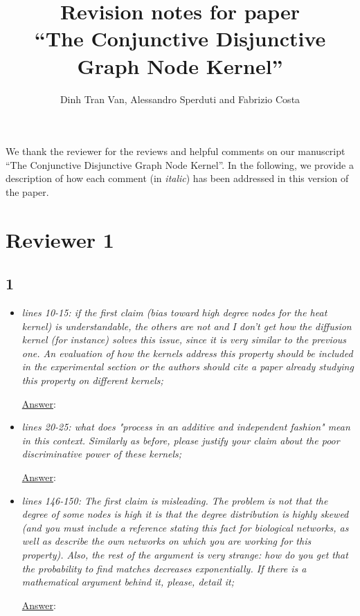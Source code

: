 \documentclass[11pt]{article}
\title{Revision notes for paper\\``The Conjunctive Disjunctive Graph Node Kernel''}
\author{Dinh Tran Van, Alessandro Sperduti and Fabrizio Costa }
\begin{document}
\maketitle

We thank the reviewer for the reviews and helpful comments on our manuscript ``The Conjunctive Disjunctive Graph Node Kernel''. 
In the following, we provide a description of how each comment (in \emph{italic}) has been addressed in this version of the paper.

\section{Reviewer 1}
\subsection*{1}
\begin{itemize}
\item \textit{lines 10-15: if the first claim (bias toward high degree nodes for the heat kernel) is understandable, the others are not and I don't get how the diffusion kernel (for instance) solves this issue, since it is very similar to the previous one. An evaluation of how the kernels address this property should be included in the experimental section or the authors should cite a paper already studying this property on different kernels;}

\underline{Answer}: 

\item \textit{lines 20-25: what does "process in an additive and independent fashion" mean in this context. Similarly as before, please justify your claim about the poor discriminative power of these kernels;
}

\underline{Answer}: 

\item \textit{lines 146-150: The first claim is misleading. The problem is not that the degree of some nodes is high it is that the degree distribution is highly skewed (and you must include a reference stating this fact for biological networks, as well as describe the own networks on which you are working for this property). Also, the rest of the argument is very strange: how do you get that the probability to find matches decreases exponentially. If there is a mathematical argument behind it, please, detail it;}

\underline{Answer}: 

\end{itemize}
\end{document}
